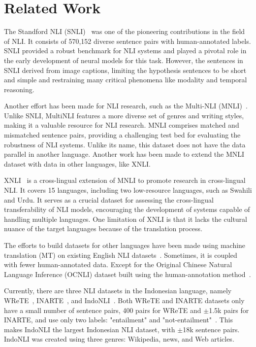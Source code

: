 \documentclass[a4paper, conference]{IEEEtran}
\begin{document}
\section{Related Work}
The Standford NLI (SNLI)~\cite{Bowman2015} was one of the pioneering contributions in the field of NLI. It consists of 570,152 diverse sentence pairs with human-annotated labels. SNLI provided a robust benchmark for NLI systems and played a pivotal role in the early development of neural models for this task. However, the sentences in SNLI derived from image captions, limiting the hypothesis sentences to be short and simple and restraining many critical phenomena like modality and temporal reasoning.

Another effort has been made for NLI research, such as the Multi-NLI (MNLI)~\cite{William2018}. Unlike SNLI, MultiNLI features a more diverse set of genres and writing styles, making it a valuable resource for NLI research. MNLI comprises matched and mismatched sentence pairs, providing a challenging test bed for evaluating the robustness of NLI systems. Unlike its name, this dataset does not have the data parallel in another language. Another work has been made to extend the MNLI dataset with data in other languages, like XNLI.

XNLI~\cite{Conneau2018} is a cross-lingual extension of MNLI to promote research in cross-lingual NLI. It covers 15 languages, including two low-resource languages, such as Swahili and Urdu. It serves as a crucial dataset for assessing the cross-lingual transferability of NLI models, encouraging the development of systems capable of handling multiple languages. One limitation of XNLI is that it lacks the cultural nuance of the target languages because of the translation process.

The efforts to build datasets for other languages have been made using machine translation (MT) on existing English NLI datasets~\cite{Mehdad2011}. Sometimes, it is coupled with fewer human-annotated data\cite{Negri2011, Agic2018}. Except for the Original Chinese Natural Language Inference (OCNLI) dataset built using the human-annotation method~\cite{Hu2020}.

Currently, there are three NLI datasets in the Indonesian language, namely WReTE~\cite{Setya2018}, INARTE~\cite{Abdiansah2018}, and IndoNLI~\cite{Mahendra2021}. Both WReTE and INARTE datasets only have a small number of sentence pairs, 400 pairs for WReTE and $\pm$1.5k pairs for INARTE, and use only two labels: "entailment" and "not-entailment"~\cite{Mahendra2021}. This makes IndoNLI the largest Indonesian NLI dataset, with $\pm$18k sentence pairs. IndoNLI was created using three genres: Wikipedia, news, and Web articles.
\end{document}
